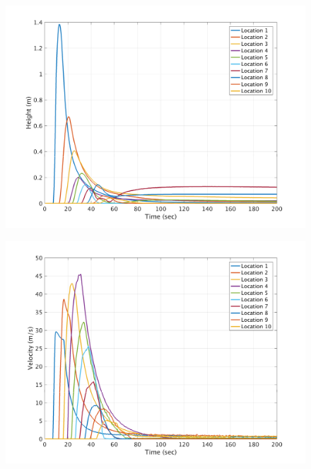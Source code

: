\documentclass[a4paper,10pt]{article}
\begin{document}
\begin{figure}[H]
	\begin{minipage}[b]{0.5\linewidth}
	\centering
    \includegraphics[width=1\textwidth]{MeansAll/HC_all.png}     
        \label{fig:M_HCall}
	\end{minipage}
	\begin{minipage}[b]{0.5\linewidth}
	\centering
    \includegraphics[width=1\textwidth]{MeansAll/VC_all.png}     
        \label{fig:M_VCall}
	\end{minipage}
	

\end{figure}
\end{document}
